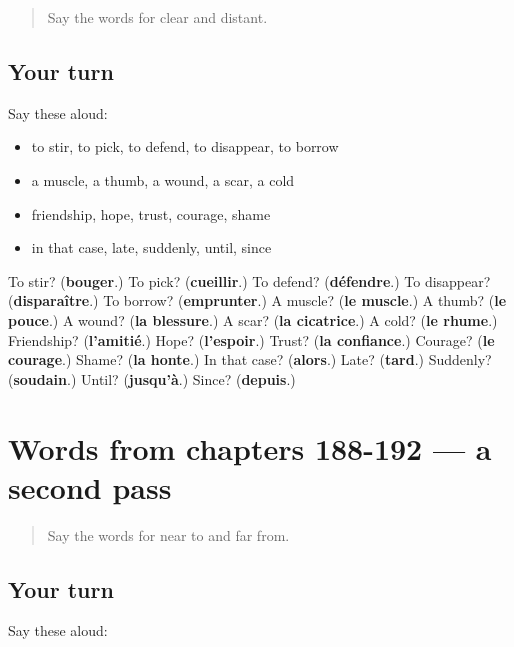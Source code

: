 \label{lesson:FR-R192-first-pass-words-from-chapters-184-187}



\begin{quote}
Say the words for clear and distant.
\end{quote}

\subsection*{Your turn}
Say these aloud:

\begin{itemize}
\raggedright
  \item to stir, to pick, to defend, to disappear, to borrow
  \item a muscle, a thumb, a wound, a scar, a cold
  \item friendship, hope, trust, courage, shame
  \item in that case, late, suddenly, until, since
\end{itemize}

\begin{tcolorbox}[breakable,colback=teal!4,colframe=teal!35!black,title={Before you move on}]
To stir? (\textbf{bouger}.) To pick? (\textbf{cueillir}.) To defend? (\textbf{défendre}.) To disappear? (\textbf{disparaître}.) To borrow? (\textbf{emprunter}.) A muscle? (\textbf{le muscle}.) A thumb? (\textbf{le pouce}.) A wound? (\textbf{la blessure}.) A scar? (\textbf{la cicatrice}.) A cold? (\textbf{le rhume}.) Friendship? (\textbf{l'amitié}.) Hope? (\textbf{l'espoir}.) Trust? (\textbf{la confiance}.) Courage? (\textbf{le courage}.) Shame? (\textbf{la honte}.) In that case? (\textbf{alors}.) Late? (\textbf{tard}.) Suddenly? (\textbf{soudain}.) Until? (\textbf{jusqu'à}.) Since? (\textbf{depuis}.)
\end{tcolorbox}
\section[(dialogue)]{Words from chapters 188-192 — a second pass}

\label{lesson:FR-R192-second-pass-words-from-chapters-188-192}



\begin{quote}
Say the words for near to and far from.
\end{quote}

\subsection*{Your turn}
Say these aloud:

